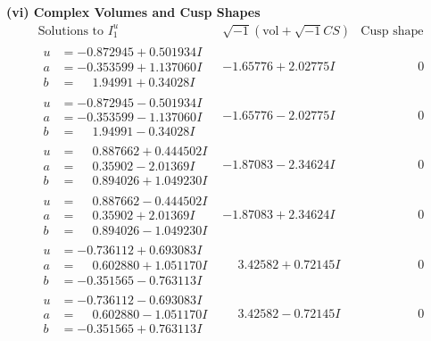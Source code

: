 \documentclass[1p]{elsarticle_modified}
\theoremstyle{definition}
\newcommand{\I}{\sqrt{-1}}
\begin{document}
\newpage\flushleft \textbf{(vi) Complex Volumes and Cusp Shapes}
$$\begin{array}{c|c|c}  
\text{Solutions to }I^u_{1}& \I (\text{vol} + \sqrt{-1}CS) & \text{Cusp shape}\\
 \hline 
\begin{aligned}
u &= -0.872945 + 0.501934 I \\
a &= -0.353599 + 1.137060 I \\
b &= \phantom{-}1.94991 + 0.34028 I\end{aligned}
 & -1.65776 + 2.02775 I & \phantom{-0.000000 } 0 \\ \hline\begin{aligned}
u &= -0.872945 - 0.501934 I \\
a &= -0.353599 - 1.137060 I \\
b &= \phantom{-}1.94991 - 0.34028 I\end{aligned}
 & -1.65776 - 2.02775 I & \phantom{-0.000000 } 0 \\ \hline\begin{aligned}
u &= \phantom{-}0.887662 + 0.444502 I \\
a &= \phantom{-}0.35902 - 2.01369 I \\
b &= \phantom{-}0.894026 + 1.049230 I\end{aligned}
 & -1.87083 - 2.34624 I & \phantom{-0.000000 } 0 \\ \hline\begin{aligned}
u &= \phantom{-}0.887662 - 0.444502 I \\
a &= \phantom{-}0.35902 + 2.01369 I \\
b &= \phantom{-}0.894026 - 1.049230 I\end{aligned}
 & -1.87083 + 2.34624 I & \phantom{-0.000000 } 0 \\ \hline\begin{aligned}
u &= -0.736112 + 0.693083 I \\
a &= \phantom{-}0.602880 + 1.051170 I \\
b &= -0.351565 - 0.763113 I\end{aligned}
 & \phantom{-}3.42582 + 0.72145 I & \phantom{-0.000000 } 0 \\ \hline\begin{aligned}
u &= -0.736112 - 0.693083 I \\
a &= \phantom{-}0.602880 - 1.051170 I \\
b &= -0.351565 + 0.763113 I\end{aligned}
 & \phantom{-}3.42582 - 0.72145 I & \phantom{-0.000000 } 0 \\ \hline\begin{aligned}

\end{aligned}
\end{array}$$
\end{document}
